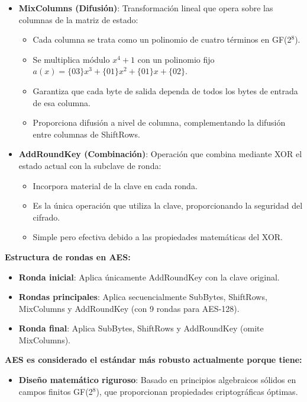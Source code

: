{\begin{itemize}
    \item \textbf{MixColumns (Difusión)}: Transformación lineal que opera sobre las columnas de la matriz de estado:
    \begin{itemize}
        \item Cada columna se trata como un polinomio de cuatro términos en GF(2$^8$).
        \item Se multiplica módulo $x^4+1$ con un polinomio fijo $a(x) = \{03\}x^3 + \{01\}x^2 + \{01\}x + \{02\}$.
        \item Garantiza que cada byte de salida dependa de todos los bytes de entrada de esa columna.
        \item Proporciona difusión a nivel de columna, complementando la difusión entre columnas de ShiftRows.
    \end{itemize}
    
    \item \textbf{AddRoundKey (Combinación)}: Operación que combina mediante XOR el estado actual con la subclave de ronda:
    \begin{itemize}
        \item Incorpora material de la clave en cada ronda.
        \item Es la única operación que utiliza la clave, proporcionando la seguridad del cifrado.
        \item Simple pero efectiva debido a las propiedades matemáticas del XOR.
    \end{itemize}
\end{itemize}

\textbf{Estructura de rondas en AES:}
\begin{itemize}
    \item \textbf{Ronda inicial}: Aplica únicamente AddRoundKey con la clave original.
    \item \textbf{Rondas principales}: Aplica secuencialmente SubBytes, ShiftRows, MixColumns y AddRoundKey (con 9 rondas para AES-128).
    \item \textbf{Ronda final}: Aplica SubBytes, ShiftRows y AddRoundKey (omite MixColumns).
\end{itemize}

\textbf{AES es considerado el estándar más robusto actualmente porque tiene:}
\begin{itemize}
    \item \textbf{Diseño matemático riguroso}: Basado en principios algebraicos sólidos en campos finitos GF(2$^8$), que proporcionan propiedades criptográficas óptimas.
    

\end{itemize}}
